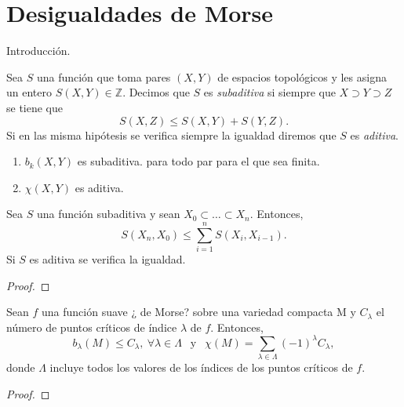 \section{Desigualdades de Morse}

{\color{red} Introducción.}

\begin{definition}
    Sea $S$ una función que toma pares $(X,Y)$ de espacios topológicos y les asigna un entero $S(X,Y)\in \mathbb{Z}$. Decimos que $S$ es \textit{subaditiva} si siempre que $X\supset Y\supset Z$ se tiene que
    \begin{equation*}
        S(X,Z) \le S(X,Y) + S(Y,Z).
    \end{equation*}
    Si en las misma hipótesis se verifica siempre la igualdad diremos que $S$ es \textit{aditiva}.
\end{definition}

\begin{example}
    \hfill
    \begin{enumerate}[label=(\roman*)]
        \item $b_k(X,Y)$ es subaditiva. para todo par para el que sea finita.
        \item $\chi (X,Y)$ es aditiva.
    \end{enumerate}
\end{example}

\bigskip

\begin{lemma}
    Sea $S$ una función subaditiva y sean $X_0\subset \dots \subset X_n$. Entonces,
    \begin{equation*}
        S(X_n, X_0) \le \sum^n_{i=1} S(X_i,X_{i-1}).
    \end{equation*}
    Si $S$ es aditiva se verifica la igualdad.
\end{lemma}
\begin{proof}
    
\end{proof}

\begin{theorem}
    Sean $f$ una función suave {¿\color{blue} de Morse?} sobre una variedad compacta M y $C_{\lambda}$ el número de puntos críticos de índice $\lambda$ de $f$. Entonces,
    \begin{equation*}
        b_{\lambda}(M) \le C_{\lambda},~\forall \lambda\in\Lambda ~~\text{ y }~~ \chi(M) = \sum_{\lambda\in\Lambda} (-1)^{\lambda} C_{\lambda},
    \end{equation*}
    donde $\Lambda$ incluye todos los valores de los índices de los puntos críticos de $f$.
\end{theorem}
\begin{proof}
    
\end{proof}

